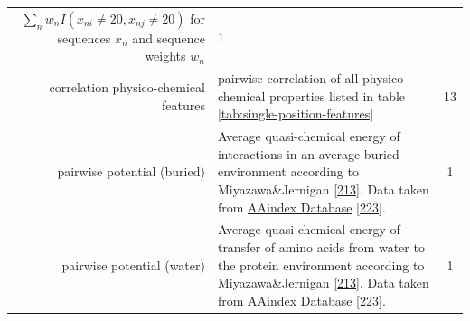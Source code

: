 \documentclass[11pt,a4paper,twoside]{book}
\theoremstyle{definition}
\theoremstyle{definition}
\theoremstyle{remark}
\begin{document}
\begin{longtable}[]{@{}rlc@{}}
\begin{minipage}[t]{0.50\columnwidth}
\(\sum_n w_n I(x_{ni} \! \neq \! 20, x_{nj} \! \neq \! 20)\) for
sequences \(x_n\) and sequence weights \(w_n\)\strut
\end{minipage} & \begin{minipage}[t]{0.18\columnwidth}\centering\strut
1\strut
\end{minipage}\tabularnewline
\begin{minipage}[t]{0.23\columnwidth}\raggedleft\strut
correlation physico-chemical features\strut
\end{minipage} & \begin{minipage}[t]{0.50\columnwidth}\raggedright\strut
pairwise correlation of all physico-chemical properties listed in table
\ref{tab:single-position-features}\strut
\end{minipage} & \begin{minipage}[t]{0.18\columnwidth}\centering\strut
13\strut
\end{minipage}\tabularnewline
\begin{minipage}[t]{0.23\columnwidth}\raggedleft\strut
pairwise potential (buried)\strut
\end{minipage} & \begin{minipage}[t]{0.50\columnwidth}\raggedright\strut
Average quasi-chemical energy of interactions in an average buried
environment according to Miyazawa\&Jernigan
{[}\protect\hyperlink{ref-Miyazawa1999a}{213}{]}. Data taken from
\href{http://www.genome.jp/dbget-bin/www_bget?aaindex:MIYS990107}{AAindex
Database} {[}\protect\hyperlink{ref-Kawashima2008}{223}{]}.\strut
\end{minipage} & \begin{minipage}[t]{0.18\columnwidth}\centering\strut
1\strut
\end{minipage}\tabularnewline
\begin{minipage}[t]{0.23\columnwidth}\raggedleft\strut
pairwise potential (water)\strut
\end{minipage} & \begin{minipage}[t]{0.50\columnwidth}\raggedright\strut
Average quasi-chemical energy of transfer of amino acids from water to
the protein environment according to Miyazawa\&Jernigan
{[}\protect\hyperlink{ref-Miyazawa1999a}{213}{]}. Data taken from
\href{http://www.genome.jp/dbget-bin/www_bget?aaindex:MIYS990106}{AAindex
Database} {[}\protect\hyperlink{ref-Kawashima2008}{223}{]}.\strut
\end{minipage} & \begin{minipage}[t]{0.18\columnwidth}\centering\strut
1\strut
\end{minipage}\tabularnewline

\end{longtable}
\end{document}
